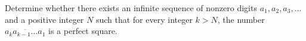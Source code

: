 Determine whether there exists an infinite sequence of nonzero digits $a_1, a_2, a_3, \ldots$ and a positive integer $N$ such that for every integer $k > N$, the number $\overline{a_k a_{k-1} \ldots a_1}$ is a perfect square.
